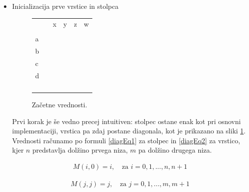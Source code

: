 \documentclass[a4paper,12pt,openright]{book}
\begin{document}
\begin{itemize}
    \item Inicializacija prve vrstice in stolpca
    
\begin{figure}[htb]
\centering
\begin{tabular}{|l|l|l|l|l|l|}
\cline{3-6}
\multicolumn{2}{c|}{}  & x & y & z & w \\ \cline{2-6}
\multicolumn{1}{c|}{} & \cellcolor{blue!15}{0} & \multicolumn{4}{c}{} \\ \cline{1-3}
a  & \cellcolor{blue!15}{1} & \cellcolor{blue!15}{1} & \multicolumn{3}{c}{} \\ \cline{1-4}
b  & \cellcolor{blue!15}{2} & & \cellcolor{blue!15}{2} & \multicolumn{2}{c}{}  \\ \cline{1-5}
c  & \cellcolor{blue!15}{3} & & & \cellcolor{blue!15}{3} & \multicolumn{1}{c}{} \\ \cline{1-6}
d  & \cellcolor{blue!15}{4} & & & & \cellcolor{blue!15}{4} \\ \hline
 \multicolumn{1}{c|}{} & & & & & \multicolumn{1}{c}{}  \\ \cline{2-5}
\multicolumn{1}{c|}{} & & & & \multicolumn{2}{c}{}   \\ \cline{2-4}
\multicolumn{1}{c|}{} & & &  \multicolumn{3}{c}{}   \\ \cline{2-3}
\multicolumn{1}{c|}{} & & \multicolumn{4}{c}{}  \\ \cline{2-2}
\end{tabular}
\caption{Začetne vrednosti.}
\label{diagMemory1}
\end{figure}

Prvi korak je še vedno precej intuitiven: stolpec ostane enak kot pri osnovni implementaciji, vrstica pa zdaj postane diagonala, kot je prikazano na sliki \ref{diagMemory1}. Vrednosti računamo po formuli \ref{diagEq1} za stolpec in \ref{diagEq2} za vrstico, kjer $n$ predstavlja dolžino prvega niza, $m$ pa dolžino drugega niza.

\begin{equation}
\label{diagEq1}
\begin{aligned}
M(i, 0) = i , \quad \text{za } i=0,1,...,n,n+1
\end{aligned}
\end{equation}

\begin{equation}
\label{diagEq2}
\begin{aligned}
M(j, j) = j , \quad \text{za } j=0,1,...,m,m+1
\end{aligned}
\end{equation}
    

\end{itemize}
\end{document}
